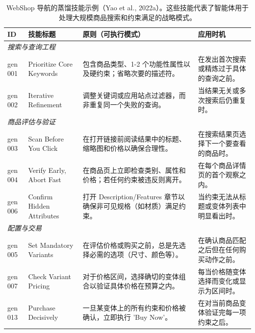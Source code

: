 \documentclass[11pt,UTF8,fontset=fandol]{ctexart}
\begin{document}
\begin{table}[H]\centering
\caption{WebShop 导航的蒸馏技能示例（Yao et al., 2022a）。这些技能代表了智能体用于处理大规模商品搜索和约束满足的战略模式。}
\label{tab:7}
\small
\renewcommand{\arraystretch}{1.2}
\begin{tabular}{p{1.1cm}p{2.8cm}p{6.0cm}p{4.2cm}}
\toprule
ID & 技能标题 & 原则（可执行模式） & 应用时机 \\
\midrule
\multicolumn{4}{l}{\textit{搜索与查询工程}} \\
gen 001 & Prioritize Core Keywords & 包含商品类型、1-2 个功能性属性以及硬约束；省略次要的描述符。 & 在发出首次搜索或精炼过于具体的查询之前。 \\
gen 002 & Iterative Refinement & 调整关键词或应用站点过滤器，而非重复同一个失败的查询。 & 当结果无关或多次搜索后仍重复时。 \\
\multicolumn{4}{l}{\textit{商品评估与验证}} \\
gen 003 & Scan Before You Click & 在打开链接前阅读结果中的标题、缩略图和价格以确保合理性。 & 在搜索结果页选择下一个要查看的商品时。 \\
gen 004 & Verify Early, Abort Fast & 在商品页上立即检查类别、属性和价格；若任何约束被违反则离开。 & 在每个商品详情页的首个观察之内。 \\
gen 006 & Confirm Hidden Attributes & 打开 Description/Features 章节以确保非可见规格（如材质）满足约束。 & 当约束无法从标题或变体列表中明显看出时。 \\
\multicolumn{4}{l}{\textit{配置与交易}} \\
gen 005 & Set Mandatory Variants & 在评估价格或购买之前，总是先选择必需的选项（尺寸、颜色等）。 & 在确认商品匹配之后但在任何购买动作之前。 \\
gen 007 & Check Variant Pricing & 对于价格区间，选择确切的变体组合以验证具体价格在预算之内。 & 每当价格随变体选择而变化或显示为区间时。 \\
gen 013 & Purchase Decisively & 一旦某变体上的所有约束和价格被确认，立即执行 'Buy Now'。 & 在对当前商品变体验证完每一项约束之后。 \\
\bottomrule
\end{tabular}
\end{table}
\end{document}
